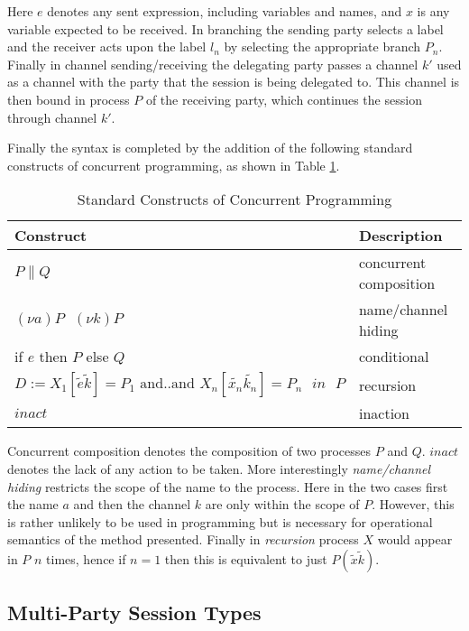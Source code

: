 Here $e$ denotes any sent expression, including variables and names, and $x$ is any variable expected to be received. In branching the sending party selects a label and the receiver acts upon the label $l_n$ by selecting the appropriate branch $P_n$. Finally in channel sending/receiving the delegating party passes a channel $k'$ used as a channel with the party that the session is being delegated to. This channel is then bound in process $P$ of the receiving party, which continues the session through channel $k'$.

Finally the syntax is completed by the addition of the following standard constructs of concurrent programming, as shown in Table \ref{TBstd_constructs}.

\begin{table}[H]
\center
\caption{Standard Constructs of Concurrent Programming}
\begin{tabular}{|l|l|}
  \hline
  Construct & Description \\
  \hline
  $P\|Q$ &concurrent composition\\
  $(\nu a)P \mbox{  } (\nu k)P$  & name/channel hiding \\
  if $e$ then $P$ else $Q$ & conditional \\
  $D:=X_1[\tilde{e}\tilde{k}]=P_1\mbox{ and..and } X_n[\tilde{x_n}\tilde{k_n}] = P_n\mbox{ } in \mbox{ }P$ & recursion\\
  $inact$ & inaction \\
  \hline
\end{tabular}
\label{TBstd_constructs}
\end{table}

Concurrent composition denotes the composition of two processes $P$ and $Q$. $inact$ denotes the lack of any action to be taken. More interestingly \textit{name/channel hiding} restricts the scope of the name to the process. Here in the two cases first the name $a$ and then the channel $k$ are only within the scope of $P$. However, this is rather unlikely to be used in programming but is necessary for operational semantics of the method presented. Finally in \textit{recursion} process $X$ would appear in $P$ $n$ times, hence if $n=1$ then this is equivalent to just $P(\tilde{x}\tilde{k})$.	
		
		\subsection{Multi-Party Session Types}
		\label{subsec:mpsessiontypes}
		
